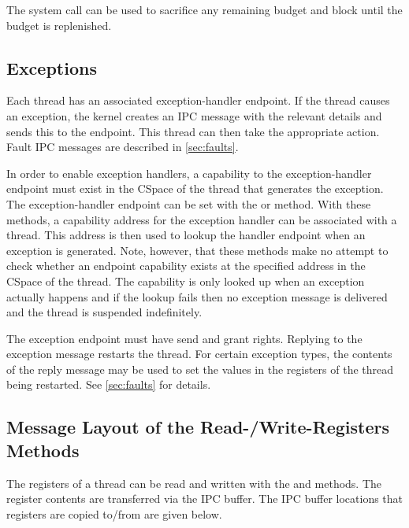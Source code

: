 The system call  can be used to sacrifice any remaining budget and block until the budget is replenished.

\subsection{Exceptions}

Each thread has an associated exception-handler endpoint. If the thread
causes an exception, the kernel creates an IPC message with the relevant
details and sends this to the endpoint. This
thread can then take the appropriate action. Fault IPC messages are
described in \autoref{sec:faults}.

In order to enable exception handlers, a capability to the exception-handler
endpoint must exist in the CSpace of the thread that generates the exception.
The exception-handler
endpoint can be set with the  or
 method.
With these methods, a capability address for the exception handler can be associated with a thread.
This address is then used to lookup the handler endpoint when an exception is generated.
Note, however, that these methods make no attempt to check whether an endpoint capability exists at the specified
address in the CSpace of the thread. The capability is only looked up
when an exception actually happens and if the lookup fails then no
exception message is delivered and the thread is suspended indefinitely.

The exception endpoint must have send and grant rights. Replying to the
exception message restarts the thread. For certain exception types, the contents of
the reply message may be used to set the values in the registers of the
thread being restarted.
See \autoref{sec:faults} for details.



\subsection{Message Layout of the Read-/Write-Registers Methods}
\label{sec:read_write_registers}

The registers of a thread can be read and written with the
 and  methods. The register contents are transferred via the IPC buffer. The IPC buffer locations that registers are copied to/from are given below.

